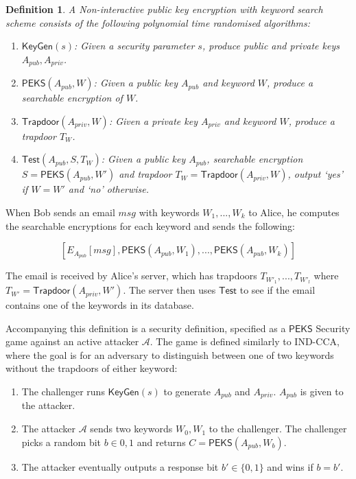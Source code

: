 \documentclass[a4paper,11pt]{article}
\newtheorem{definition}{Definition}
\begin{document}
    \begin{definition}
        A Non-interactive public key encryption with keyword search scheme consists of the following polynomial time randomised algorithms:

        \begin{enumerate}
            \item $\mathsf{KeyGen}(s)$: Given a security parameter $s$, produce public and private keys $A_{pub}, A_{priv}$.
            \item $\mathsf{PEKS}(A_{pub}, W)$: Given a public key $A_{pub}$ and keyword $W$, produce a searchable encryption of $W$.
            \item $\mathsf{Trapdoor}(A_{priv}, W)$: Given a private key $A_{priv}$ and keyword $W$, produce a trapdoor $T_W$.
            \item $\mathsf{Test}(A_{pub}, S, T_W)$: Given a public key $A_{pub}$, searchable encryption $S = \mathsf{PEKS}(A_{pub}, W')$ and trapdoor $T_W = \mathsf{Trapdoor}(A_{priv}, W)$, output `yes' if $W = W'$ and `no' otherwise.
        \end{enumerate}
    \end{definition}

    When Bob sends an email $msg$ with keywords $W_1,...,W_k$ to Alice, he computes the searchable encryptions for each keyword and sends the following:

    $$[E_{A_{pub}}[msg], \mathsf{PEKS}(A_{pub}, W_1),...,\mathsf{PEKS}(A_{pub}, W_k)]$$

    The email is received by Alice's server, which has trapdoors $T_{W'_1},...,T_{W'_l}$ where $T_{W'} = \mathsf{Trapdoor}(A_{priv}, W')$. The server then uses $\mathsf{Test}$ to see if the email contains one of the keywords in its database.

    Accompanying this definition is a security definition, specified as a $\mathsf{PEKS}$ Security game against an active attacker $\mathcal{A}$. The game is defined similarly to IND-CCA, where the goal is for an adversary to distinguish between one of two keywords without the trapdoors of either keyword:

    \begin{enumerate}
        \item The challenger runs $\mathsf{KeyGen}(s)$ to generate $A_{pub}$ and $A_{priv}$. $A_{pub}$ is given to the attacker.
        \item The attacker $\mathcal{A}$ sends two keywords $W_0, W_1$ to the challenger. The challenger picks a random bit $b \in {0,1}$ and returns $C = \mathsf{PEKS}(A_{pub}, W_b)$.
        \item The attacker eventually outputs a response bit $b' \in \{0,1\}$ and wins if $b = b'$.
    \end{enumerate}
\end{document}
